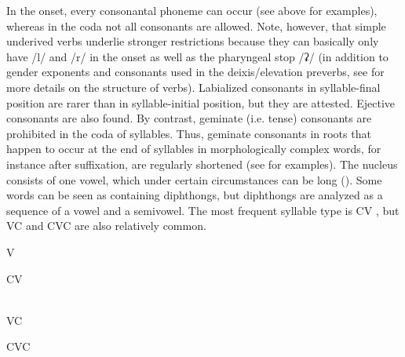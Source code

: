 In the onset, every consonantal phoneme can occur (see  above for examples), whereas in the coda not all consonants are allowed. Note, however, that simple underived verbs underlie stronger restrictions because they can basically only have /l/ and /r/ in the onset as well as the pharyngeal stop /ʡ/ (in addition to gender exponents and consonants used in the deixis/elevation preverbs, see  for more details on the structure of verbs). Labialized consonants in syllable-final position are rarer than in syllable-initial position, but they are attested. Ejective consonants are also found. By contrast, geminate (i.e. tense) consonants are prohibited in the coda of syllables. Thus, geminate consonants in roots that happen to occur at the end of syllables in morphologically complex words, for instance after suffixation, are regularly shortened (see  for examples). The nucleus consists of one vowel, which under certain circumstances can be long (). Some words can be seen as containing diphthongs, but diphthongs are analyzed as a sequence of a vowel and a semivowel. The most frequent syllable type is CV , but VC  and CVC  are also relatively common.
%
\begin{exe}
\TabPositions{11em}
	\ex	V	\label{ex:syllable V phon} \\
		 	\tab {} 	
\end{exe}	

\begin{exe}
\TabPositions{11em}
	\ex	CV	\label{ex:syllable CV phon} \\
		 	\tab {} 	\\
		  	\tab{} 		
		 	\tab {} 	
\end{exe}	

\begin{exe}
\TabPositions{11em}
	\ex	VC	\label{ex:syllable VC phon} \\
		 	\tab {} 	
\end{exe}

\begin{exe}
\TabPositions{11em}
	\ex	CVC	\label{ex:syllable CVC phon} \\
		 	\tab 	{} 	\\
		 	\tab 	{} 	\\
		 	\tab 	{} 	
\end{exe}

